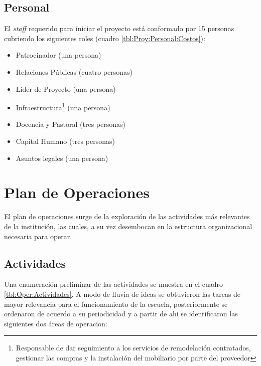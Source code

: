 \subsection{Personal}

El \emph{staff} requerido para iniciar el proyecto está conformado por 15 personas cubriendo los siguientes roles (cuadro \ref{tbl:Proy:Personal:Costos}):

\begin{itemize}
	\item Patrocinador (una persona)
	\item Relaciones Públicas (cuatro personas)
	\item Líder de Proyecto (una persona)
	\item Infraestructura\footnote{Responsable de dar seguimiento a los servicios de remodelación contratados, gestionar las compras y la instalación del mobiliario por parte del proveedor} (una persona)
	\item Docencia y Pastoral (tres personas)
	\item Capital Humano (tres personas)
	\item Asuntos legales (una persona)
\end{itemize}

\clearpage









\clearpage

\section{Plan de Operaciones}

El plan de operaciones surge de la exploración de las actividades más relevantes de la institución, las cuales, a su vez desembocan en la estructura organizacional necesaria para operar.

\subsection{Actividades}

Una enumeración preliminar de las actividades se muestra en el cuadro \ref{tbl:Oper:Actividades}. A modo de lluvia de ideas se obtuvieron las tareas de mayor relevancia para el funcionamiento de la escuela, posteriormente se ordenaron de acuerdo a su periodicidad y a partir de ahi se identificaron las siguientes dos áreas de operacion:

